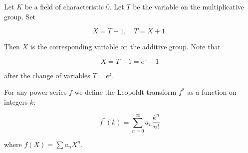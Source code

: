 Let $K$ be a field of characteristic $0$. Let $T$ be the variable on the multiplicative group. Set

$$X = T - 1, \quad T = X + 1.$$

Then $X$ is the corresponding variable on the additive group. Note that

$$X = T - 1 = e^z - 1$$

after the change of variables $T = e^z$.

For any power series $f$ we define the Leopoldt transform $f^*$ as a function on integers $k$:

$$f^*(k) = \sum_{n=0}^{\infty} a_n \frac{k^n}{n!}$$

where $f(X) = \sum a_n X^n$.
